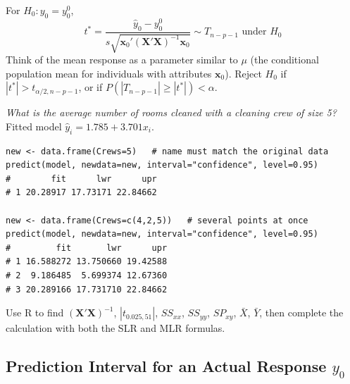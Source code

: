 \begin{definition}
    For $H_0:y_0=y_0^0$,
    \[t^*=\frac{\hat y_0-y_0^0}{s\sqrt{\mathbf{x}_0'(\mathbf{X}'\mathbf{X})^{-1}\mathbf{x}_0}}\sim T_{n-p-1}\text{ under }H_0\]
    Think of the mean response as a parameter similar to $\mu$ (the conditional
    population mean for individuals with attributes $\mathbf{x}_0$). Reject $H_0$ if
    $|t^*|>t_{\alpha/2,n-p-1}$, or if $P(|T_{n-p-1}|\geq|t^*|)<\alpha$.
\end{definition}

\begin{example}
    \textit{What is the average number of rooms cleaned with a cleaning crew of size 5?}
    Fitted model $\hat y_i=1.785+3.701x_i$.
\begin{verbatim}
new <- data.frame(Crews=5)   # name must match the original data
predict(model, newdata=new, interval="confidence", level=0.95)
#        fit      lwr      upr
# 1 20.28917 17.73171 22.84662

new <- data.frame(Crews=c(4,2,5))   # several points at once
predict(model, newdata=new, interval="confidence", level=0.95)
#         fit       lwr      upr
# 1 16.588272 13.750660 19.42588
# 2  9.186485  5.699374 12.67360
# 3 20.289166 17.731710 22.84662
\end{verbatim}
\end{example}

\begin{exercise}
    Use R to find $(\mathbf{X}'\mathbf{X})^{-1}$, $|t_{0.025,51}|$, $SS_{xx}$, $SS_{yy}$,
    $SP_{xy}$, $\bar X$, $\bar Y$, then complete the calculation with both the SLR and MLR formulas.
    \\
\end{exercise}

\subsection{Prediction Interval for an Actual Response $y_0$}

